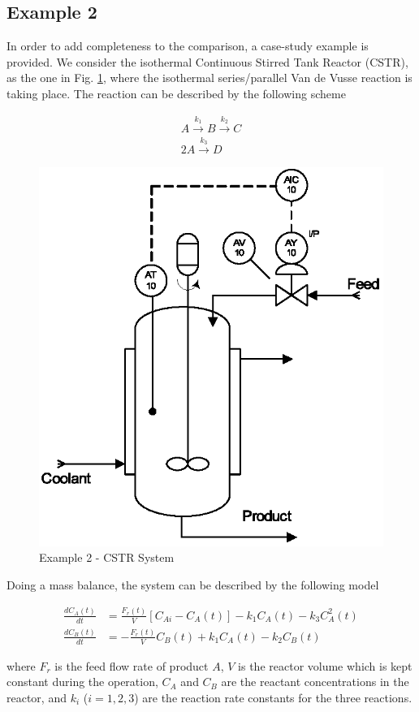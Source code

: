 \subsection{Example 2}

In order to add completeness to the comparison, a case-study
example is provided. We consider the isothermal Continuous Stirred
Tank Reactor (CSTR), as the one in Fig. \ref{CSTR}, where the
isothermal series/parallel Van de Vusse reaction \cite{VandeVusse,
VandeVusse2} is taking place. The reaction can be described by the
following scheme

\begin{align}
    A \overset{k_1}{\longrightarrow} B \overset{k_2}{\longrightarrow}C\\
    2 A \overset{k_3}{\longrightarrow} D \nonumber
\end{align}

\begin{figure}[htb!]
\centering
\includegraphics[width=0.5\linewidth]{Reactor02.eps}
\caption{Example 2 - CSTR System} \label{CSTR}
\end{figure}

Doing a mass balance, the system can be described by the following
model

\begin{align}
    \frac{dC_A(t)}{dt} & = \frac{F_r(t)}{V} \left[C_{Ai}-C_A(t)\right] - k_1 C_A(t) - k_3 C^2_A(t) \nonumber \\
    \frac{dC_B(t)}{dt} & = -\frac{F_r(t)}{V} C_B(t)+ k_1 C_A(t) - k_2 C_B(t)
    \label{system3}
\end{align}

\noindent where $F_r$ is the feed flow rate of product $A$, $V$ is
the reactor volume which is kept constant during the operation,
$C_A$ and $C_B$ are the reactant concentrations in the reactor,
and $k_i$ ($i=1,2,3$) are the reaction rate constants for the
three reactions.

